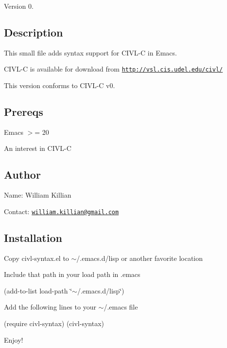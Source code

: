 Version 0.

\subsection*{Description }

This small file adds syntax support for C\+I\+V\+L-\/\+C in Emacs.

C\+I\+V\+L-\/\+C is available for download from \href{http://vsl.cis.udel.edu/civl/}{\tt http\+://vsl.\+cis.\+udel.\+edu/civl/}

This version conforms to C\+I\+V\+L-\/\+C v0.

\subsection*{Prereqs }


\begin{DoxyEnumerate}
\item Emacs $>$= 20
\item An interest in C\+I\+V\+L-\/\+C
\end{DoxyEnumerate}

\subsection*{Author }

Name\+: William Killian

Contact\+: \href{mailto:william.killian@gmail.com}{\tt william.\+killian@gmail.\+com}

\subsection*{Installation}


\begin{DoxyItemize}
\item Copy civl-\/syntax.\+el to $\sim$/.emacs.\+d/lisp or another favorite location
\item Include that path in your load path in .emacs
\end{DoxyItemize}

(add-\/to-\/list \textquotesingle{}load-\/path \char`\"{}$\sim$/.\+emacs.\+d/lisp\char`\"{})


\begin{DoxyItemize}
\item Add the following lines to your $\sim$/.emacs file
\end{DoxyItemize}

(require \textquotesingle{}civl-\/syntax) (civl-\/syntax)


\begin{DoxyItemize}
\item Enjoy! 
\end{DoxyItemize}